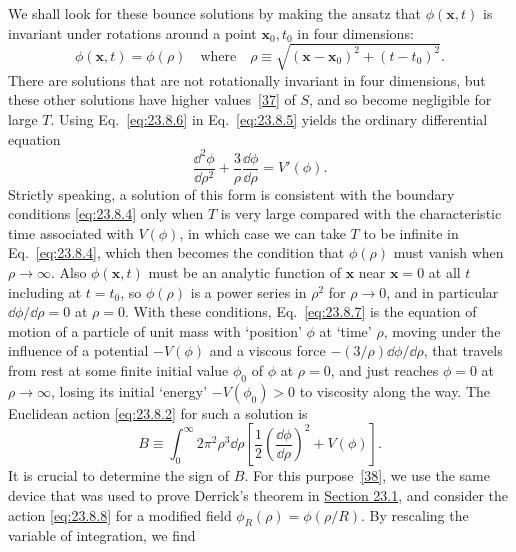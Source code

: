 We shall look for these bounce solutions by making the ansatz that $\phi(\mathbf x,t)$ is invariant under rotations around a point $\mathbf x_0,t_0$ in four dimensions:
\begin{equation}
 \phi(\mathbf x,t)=\phi(\rho)
 \quad\text{where}\quad
 \rho\equiv\sqrt{(\mathbf x-\mathbf x_0)^2+(t-t_0)^2}.
 \tag{23.8.6}\label{eq:23.8.6}
\end{equation}
There are solutions that are not rotationally invariant in four dimensions, but these other solutions have higher values~\hyperref[ch23-ref-37]{[37]} of $S$, and so become negligible for large $T$. Using Eq.~\eqref{eq:23.8.6} in Eq.~\eqref{eq:23.8.5} yields the ordinary differential equation
\begin{equation}
 \frac{\dd^2\phi}{\dd\rho^2}+\frac{3}{\rho}\frac{\dd\phi}{\dd\rho}=V'(\phi).
 \tag{23.8.7}\label{eq:23.8.7}
\end{equation}
Strictly speaking, a solution of this form is consistent with the boundary conditions \eqref{eq:23.8.4} only when $T$ is very large compared with the characteristic time associated with $V(\phi)$, in which case we can take $T$ to be infinite in Eq.~\eqref{eq:23.8.4}, which then becomes the condition that $\phi(\rho)$ must vanish when $\rho\to\infty$. Also $\phi(\mathbf x,t)$ must be an analytic function of $\mathbf x$ near $\mathbf x=0$ at all $t$ including at $t=t_0$, so $\phi(\rho)$ is a power series in $\rho^2$ for $\rho\to0$, and in particular $\dd\phi/\dd\rho=0$ at $\rho=0$. With these conditions, Eq.~\eqref{eq:23.8.7} is the equation of motion of a particle of unit mass with `position' $\phi$ at `time' $\rho$, moving under the influence of a potential $-V(\phi)$ and a viscous force $-(3/\rho)\dd\phi/\dd\rho$, that travels from rest at some finite initial value $\phi_0$ of $\phi$ at $\rho=0$, and just reaches $\phi=0$ at $\rho\to\infty$, losing its initial `energy' $-V(\phi_0)>0$ to viscosity along the way. The Euclidean action \eqref{eq:23.8.2} for such a solution is
\begin{equation}
 B\equiv\int_0^\infty 2\pi^2\rho^3\dd\rho
 \left[
 \frac{1}{2}\left(\frac{\dd\phi}{\dd\rho}\right)^2+V(\phi)
 \right].
 \tag{23.8.8}\label{eq:23.8.8}
\end{equation}
It is crucial to determine the sign of $B$. For this purpose~\hyperref[ch23-ref-38]{[38]}, we use the same device that was used to prove Derrick's theorem in \hyperref[sec:23.1]{Section 23.1}, and consider the action \eqref{eq:23.8.8} for a modified field $\phi_R(\rho)=\phi(\rho/R)$. By rescaling the variable of integration, we find
